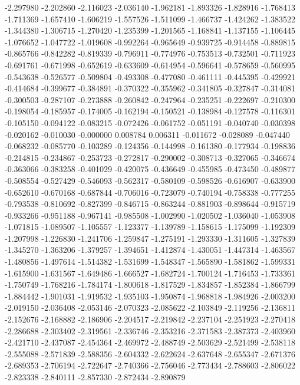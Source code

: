 -2.297980
-2.202860
-2.116023
-2.036140
-1.962181
-1.893326
-1.828916
-1.768413
-1.711369
-1.657410
-1.606219
-1.557526
-1.511099
-1.466737
-1.424262
-1.383522
-1.344380
-1.306715
-1.270420
-1.235399
-1.201565
-1.168841
-1.137155
-1.106445
-1.076652
-1.047722
-1.019608
-0.992264
-0.965649
-0.939725
-0.914458
-0.889815
-0.865766
-0.842282
-0.819339
-0.796911
-0.774976
-0.753513
-0.732501
-0.711923
-0.691761
-0.671998
-0.652619
-0.633609
-0.614954
-0.596641
-0.578659
-0.560995
-0.543638
-0.526577
-0.509804
-0.493308
-0.477080
-0.461111
-0.445395
-0.429921
-0.414684
-0.399677
-0.384891
-0.370322
-0.355962
-0.341805
-0.327847
-0.314081
-0.300503
-0.287107
-0.273888
-0.260842
-0.247964
-0.235251
-0.222697
-0.210300
-0.198054
-0.185957
-0.174005
-0.162194
-0.150521
-0.138984
-0.127578
-0.116301
-0.105150
-0.094122
-0.083215
-0.072426
-0.061752
-0.051191
-0.040740
-0.030398
-0.020162
-0.010030
-0.000000
0.008784
0.006311
-0.011672
-0.028089
-0.047440
-0.068232
-0.085770
-0.103289
-0.124356
-0.144998
-0.161380
-0.177934
-0.198836
-0.214815
-0.234867
-0.253723
-0.272817
-0.290002
-0.308713
-0.327065
-0.346674
-0.363066
-0.383258
-0.401029
-0.420075
-0.436649
-0.455985
-0.473450
-0.489877
-0.508554
-0.527429
-0.546093
-0.562317
-0.580109
-0.598526
-0.616907
-0.633900
-0.652610
-0.670168
-0.687844
-0.706016
-0.723079
-0.740194
-0.758338
-0.777255
-0.793538
-0.810692
-0.827399
-0.846715
-0.863244
-0.881903
-0.898644
-0.915719
-0.933266
-0.951188
-0.967141
-0.985508
-1.002990
-1.020502
-1.036040
-1.053908
-1.071815
-1.089507
-1.105557
-1.123377
-1.139789
-1.158615
-1.175099
-1.192309
-1.207998
-1.226830
-1.241706
-1.259847
-1.275191
-1.293330
-1.311605
-1.327839
-1.345270
-1.363206
-1.379257
-1.394651
-1.412874
-1.430051
-1.447314
-1.463567
-1.480856
-1.497614
-1.514382
-1.531699
-1.548347
-1.565890
-1.581862
-1.599331
-1.615900
-1.631567
-1.649486
-1.666527
-1.682724
-1.700124
-1.716453
-1.733361
-1.750749
-1.768216
-1.784174
-1.800618
-1.817529
-1.834857
-1.852384
-1.866799
-1.884442
-1.901031
-1.919532
-1.935103
-1.950874
-1.968818
-1.984926
-2.003200
-2.019150
-2.036408
-2.053146
-2.070323
-2.085622
-2.103849
-2.119256
-2.136811
-2.152676
-2.168882
-2.186906
-2.204517
-2.219842
-2.237104
-2.251923
-2.270418
-2.286688
-2.303402
-2.319561
-2.336746
-2.353216
-2.371583
-2.387373
-2.403960
-2.421710
-2.437087
-2.454364
-2.469972
-2.488749
-2.503629
-2.521499
-2.538118
-2.555088
-2.571839
-2.588356
-2.604332
-2.622624
-2.637648
-2.655347
-2.671376
-2.689353
-2.706194
-2.722647
-2.740366
-2.756046
-2.773434
-2.788603
-2.806022
-2.823338
-2.840111
-2.857330
-2.872434
-2.890879
